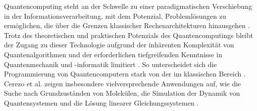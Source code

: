 
Quantencomputing steht an der Schwelle zu einer paradigmatischen
Verschiebung in der Informationsverarbeitung, mit dem Potenzial,
Problemlösungen zu ermöglichen, die über die Grenzen klassischer
Rechenarchitekturen hinausgehen \cite{Shor1999}. Trotz des theoretischen und
praktischen Potenzials des Quantencomputings bleibt der Zugang zu dieser
Technologie aufgrund der inhärenten Komplexität von Quantenalgorithmen
und der erforderlichen tiefgreifenden Kenntnisse in Quantenmechanik und
-informatik limitiert \cite{Chitransh2022}. So unterscheidet sich die Programmierung
von Quantencomputern stark von der im klassischen Bereich \cite{Rieffel2011}. 
Cerezo et al. zeigen insbesondere vielversprechende Anwendungen auf, wie die Suche nach
Grundzuständen von Molekülen, die Simulation der Dynamik von
Quantensystemen und die Lösung linearer Gleichungssystemen \cite{Cerezo2021}. 

